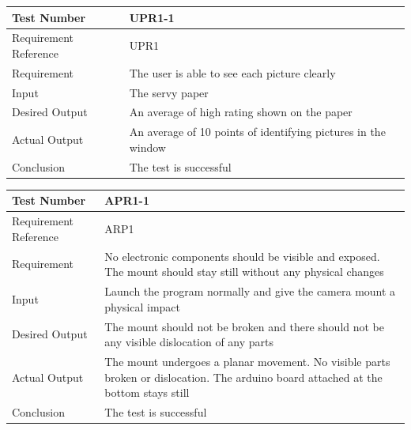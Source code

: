 \documentclass[12pt, titlepage]{article}
\begin{document}
\begin{table}[H]
\begin{center}
\begin{tabular}{|l | m{9cm}|}
\hline
  Test Number & UPR1-1\\
  \hline
  Requirement Reference & UPR1\\
  \hline
  Requirement & The user is able to see each picture clearly\\
  \hline
  Input & The servy paper\\
  \hline
  Desired Output & An average of high rating shown on the paper\\
  \hline
  Actual Output & An average of 10 points of identifying pictures in the window\\
  \hline
  Conclusion & The test is successful\\
  \hline
\end{tabular}
\end{center}           
\end{table}

\begin{table}[H]
\begin{center}
\begin{tabular}{|l | m{9cm}|}
\hline
  Test Number &  APR1-1 \\
  \hline
  Requirement Reference & ARP1 \\
  \hline
  Requirement & No electronic components should be visible and exposed. The mount should stay still without any physical changes  \\
  \hline
  Input & Launch the program normally and give the camera mount a physical impact \\
  \hline
  Desired Output & The mount should not be broken and there should not be any visible dislocation of any parts\\
  \hline
  Actual Output & The mount undergoes a planar movement. No visible parts broken or dislocation. The arduino board attached at the bottom stays still  \\
  \hline
  Conclusion & The test is successful\\
  \hline
\end{tabular}
\end{center}           
\end{table}
\end{document}
